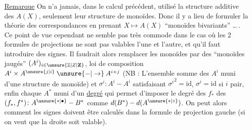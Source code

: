 
\uline{Remarque} On n'a jamais, dans le calcul précédent, utilisé la structure additive des $A(X)$, seulement leur structure de monoïdes. Donc il y a lieu de formuler la théorie des correspondances en prenant  $X\mapsto A(X)$   ``monoïdes bivariants'' \ldots\,.  Ce point de vue cependant ne semble pas très commode dans le cas où les 2 formules de projections  ne sont pas valables l'une et l'autre, et qu'il faut introduire des signes. Il faudrait alors remplacer les monoïdes par des ``monoïdes jaugés'' $(A^i)_{i\in\unsure{\mathbb Z|Z|\mathbf{Z}}}$, loi de composition $A^i\times A^{\unsure{j|i}}\mathbin{\unsure{-|\to}} A^{i+j}$ (NB : L'ensemble somme des $A^i$  muni d'une structure de monoïde) et   $\sigma^i\colon A^i\mathbin{-} A^i$ satisfaisant $ {\sigma^i}^{2}=\mathrm{id}$, $\sigma^i=\mathrm{id}$ si $i$ pair,  enfin chaque $A^*$ muni d'un \uline{degré}  qui permet d'imposer le degré des $f_*$ des $(f_*,f^*)\colon A^{\unsure{*|\bullet}}\mathbin{-}B^*$ comme  $d(B^*)-d(A^{\unsure{*|\circ}})$. On peut alors  comment les signes doivent être calculés dans la formule de projection gauche (si on veut que la droite soit valable).
